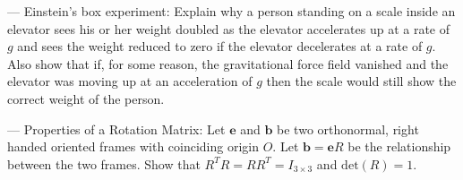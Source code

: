 \documentclass[graybox,envcountchap,sectrefs]{svmonoMuga}
\begin{document}
\begin{exercise}\label{ex:KinematicsNKineticsInElevator}
{\sf --- Einstein's box experiment:} Explain why a person standing on a scale inside an elevator sees his or her weight doubled as the elevator accelerates up at a rate of $g$ and 
sees the weight reduced to zero if the elevator decelerates at a rate of $g$. Also show that if, for some reason, the gravitational force field vanished and the elevator was moving up at 
an acceleration of $g$ then the scale would still show the correct weight of the person.
\end{exercise}


\begin{exercise}\label{ex:RotationMatrix}
{\sf --- Properties of a Rotation Matrix:} Let $\mathbf{e}$ and $\mathbf{b}$ be two orthonormal, right handed oriented frames with coinciding origin $O$. Let $\mathbf{b}=\mathbf{e}R$ be the relationship between the two frames. Show that $R^TR=RR^T=I_{3\times 3}$ and $\mathrm{det}(R)=1$.
\end{exercise}

\end{document}
